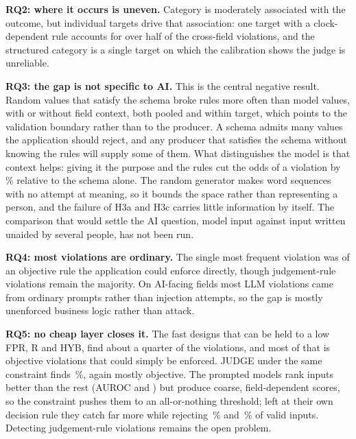 \documentclass[journal]{IEEEtran}
\begin{document}
\textbf{RQ2: where it occurs is uneven.} Category is moderately associated with the outcome, but
individual targets drive that association: one target with a clock-dependent rule accounts for over
half of the cross-field violations, and the structured category is a single target on which the
calibration shows the judge is unreliable.

\textbf{RQ3: the gap is not specific to AI.} This is the central negative result. Random values that
satisfy the schema broke rules more often than model values, with or without field context, both pooled
and within target, which points to the validation boundary rather than to the producer. A schema admits
many values the application should reject, and any producer that satisfies the schema without knowing
the rules will supply some of them. What distinguishes the model is that context helps: giving it the
purpose and the rules cut the odds of a violation by \,\% relative to the schema
alone. The random generator makes word sequences with no attempt at meaning, so it bounds the space
rather than representing a person, and the failure of H3a and H3c carries little information by itself.
The comparison that would settle the AI question, model input against input written unaided by several
people, has not been run.

\textbf{RQ4: most violations are ordinary.} The single most frequent violation was of an objective
rule the application could enforce directly, though judgement-rule violations remain the majority. On
AI-facing fields most LLM violations came from ordinary prompts rather than injection attempts, so the
gap is mostly unenforced business logic rather than attack.

\textbf{RQ5: no cheap layer closes it.} The fast designs that can be held to a low FPR, R and HYB,
find about a quarter of the violations, and most of that is objective violations that could simply be
enforced. JUDGE under the same constraint finds \,\%, again mostly objective. The
prompted models rank inputs better than the rest (AUROC  and ) but
produce coarse, field-dependent scores, so the constraint pushes them to an all-or-nothing threshold;
left at their own decision rule they catch far more while rejecting \,\% and
\,\% of valid inputs. Detecting judgement-rule violations remains the open problem.
\end{document}
